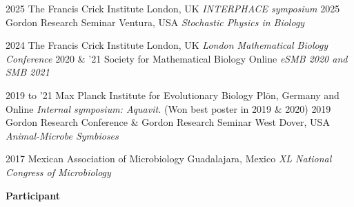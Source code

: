 \documentclass[]{friggeri-cv} %
\begin{document}
\begin{entrylist}
\entry
{2025}
{}
{The Francis Crick Institute}
{London, UK}
{{\normalsize\emph{INTERPHACE symposium}}}
{\vspace{-3mm}}
\entry
{2025}
{}
{Gordon Research Seminar}
{Ventura, USA}
{{\normalsize\emph{Stochastic Physics in Biology}}}
{\vspace{-3mm}}
\end{entrylist}
\begin{entrylist}
\entry
{2024}
{}
{The Francis Crick Institute}
{London, UK}
{{\normalsize\emph{London Mathematical Biology Conference}}}
{\vspace{-3mm}}
\entry
{2020 \& '21}
{}%
{Society for Mathematical Biology}
{Online}
{{\normalsize\emph{eSMB 2020 and SMB 2021}}}
{\vspace{-3mm}}
\end{entrylist}
\begin{entrylist}
\entry
{2019 to '21}
{}%
{Max Planck Institute for Evolutionary Biology}
{Plön, Germany and Online}
{{\normalsize\emph{Internal symposium: Aquavit.} (Won best poster in 2019 \& 2020)}}
{\vspace{-3mm}}
\entry
{2019}
{}%
{Gordon Research Conference \& Gordon Research Seminar}
{West Dover, USA}
{{\normalsize\emph{Animal-Microbe Symbioses}}}
{\vspace{-3mm}}
\end{entrylist}
\begin{entrylist}
\entry
{2017}
{}%
{Mexican Association of Microbiology}
{Guadalajara, Mexico}
{{\normalsize\emph{XL National Congress of Microbiology}}}
{\vspace{-3mm}}
\end{entrylist}

\textbf{Participant}
\end{document}
